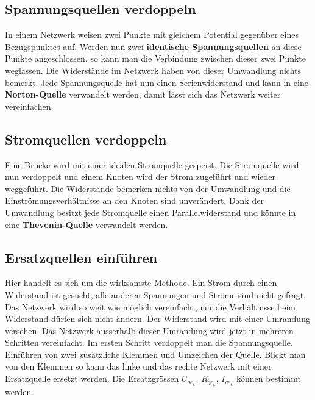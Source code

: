 \subsection{Spannungsquellen verdoppeln}
In einem Netzwerk weisen zwei Punkte mit gleichem Potential gegenüber eines Bezugspunktes auf. Werden nun zwei \textbf{identische Spannungsquellen} an diese Punkte angeschlossen, so kann man die Verbindung zwischen dieser zwei Punkte weglassen. Die Widerstände im Netzwerk haben von dieser Umwandlung nichts bemerkt.
\newline\newline
Jede Spannungsquelle hat nun einen Serienwiderstand und kann in eine \textbf{Norton-Quelle} verwandelt werden, damit lässt sich das Netzwerk weiter vereinfachen.
\subsection{Stromquellen verdoppeln}
Eine Brücke wird mit einer idealen Stromquelle gespeist. Die Stromquelle wird nun verdoppelt und einem Knoten wird der Strom zugeführt und wieder weggeführt. Die Widerstände bemerken nichts von der Umwandlung und die Einströmungsverhältnisse an den Knoten sind unverändert.
\newline\newline
Dank der Umwandlung besitzt jede Stromquelle einen Parallelwiderstand und könnte in eine \textbf{Thevenin-Quelle} verwandelt werden.
\subsection{Ersatzquellen einführen}
Hier handelt es sich um die wirksamste Methode. Ein Strom durch einen Widerstand ist gesucht, alle anderen Spannungen und Ströme sind nicht gefragt. Das Netzwerk wird so weit wie möglich vereinfacht, nur die Verhältnisse beim Widerstand dürfen sich nicht ändern. Der Widerstand wird mit einer Umrandung versehen. Das Netzwerk ausserhalb dieser Umrandung wird jetzt in mehreren Schritten vereinfacht. Im ersten Schritt verdoppelt man die Spannungsquelle.
\newline\newline
Einführen von zwei zusätzliche Klemmen und Umzeichen der Quelle. Blickt man von den Klemmen so kann das linke und das rechte Netzwerk mit einer Ersatzquelle ersetzt werden. Die Ersatzgrössen $U_{{qe}_k}$, $R_{{qe}_k}$, $I_{{qe}_k}$ können bestimmt werden.
